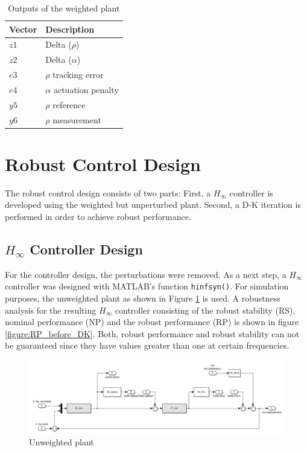 \documentclass[conference]{IEEEtran}
\begin{document}
\begin{table}[h]
\begin{center}
\begin{tabular}{|l||l|}
\hline
Vector 		& Description 		\\
\hline
$z1$ 		& Delta ($\rho$) 	\\
\hline
$z2$		& Delta ($\alpha$) 	\\
\hline
\hline
$e3$		& $\rho$ tracking error 		\\
\hline
$e4$		& $\alpha$ actuation penalty	\\
\hline
\hline
$y5$		& $\rho$ reference 		\\
\hline
$y6$		& $\rho$ measurement	\\
\hline
\end{tabular}
\caption{Outputs of the weighted plant}  
\label{figure:model_car_outputs}
\end{center}
\end{table}


\section{Robust Control Design}

The robust control design consists of two parts: First, a $H_{\infty}$ controller is developed using the weighted but unperturbed plant. Second, a D-K iteration is performed in order to achieve robust performance.

\subsection{$H_{\infty}$ Controller Design}

For the controller design, the perturbations were removed. As a next step, a $H_{\infty}$ controller was designed with \textsc{MATLAB}'s function \texttt{hinfsyn()}. For simulation purposes, the unweighted plant as shown in Figure \ref{figure:model_car_unweighted} is used. A robustness analysis for the resulting $H_{\infty}$ controller consisting of the robust stability (RS), nominal performance (NP) and the robust performance (RP) is shown in figure \ref{figure:RP_before_DK}. Both, robust performance and robust stability can not be guaranteed since they have values greater than one at certain frequencies.

\begin{figure}[h]
\centering
  \includegraphics[width=.47\textwidth]{pics/model_car_unweighted.png} 
  \caption{Unweighted plant}  
  \label{figure:model_car_unweighted}
\end{figure}
\end{document}
